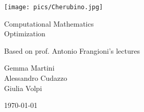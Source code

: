 \documentclass[computational_mathematics.tex]{subfiles}
\begin{document}
\begin{titlepage}
    \begin{center}
    \vspace{3cm}
    
    \Large
    
    \vspace{2cm}
    
    \texttt{[image: pics/Cherubino.jpg]}
    
    \vspace{2.5cm}
    
    {\Huge \sc Computational Mathematics\\ Optimization}
    
    \vspace{2cm}
    Based on prof. Antonio Frangioni's lectures
    
    \vspace{2cm}
    Gemma Martini\\ Alessandro Cudazzo\\ Giulia Volpi
    \vfill
    
    \today
    
    \end{center}
\end{titlepage}

\shipout\null

\tableofcontents
\let\tableofcontents\relax
\shipout\null

\newpage



\newpage



\newpage



\newpage



\newpage



\newpage



\newpage



\newpage



\newpage



\newpage
\end{document}
